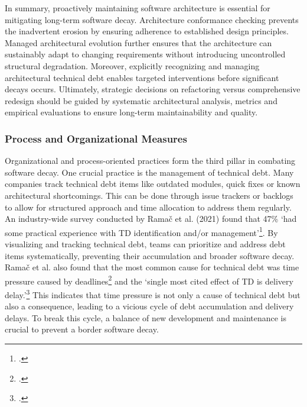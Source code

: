 In summary, proactively maintaining software architecture is essential for mitigating long-term software decay. Architecture conformance checking 
prevents the inadvertent erosion by ensuring adherence to established design principles. Managed architectural evolution further ensures that the architecture
can sustainably adapt to changing requirements without introducing uncontrolled structural degradation. Moreover, explicitly recognizing and managing architectural
technical debt enables targeted interventions before significant decays occurs. Ultimately, strategic decisions on refactoring versus comprehensive redesign should be 
guided by systematic architectural analysis, metrics and empirical evaluations to ensure long-term maintainability and quality.

\subsubsection{Process and Organizational Measures}
Organizational and process-oriented practices form the third pillar in combating software decay.
One crucial practice is the management of technical debt. Many companies track technical debt items like outdated modules, quick fixes or known architectural shortcomings.
This can be done through issue trackers or backlogs to allow for structured approach and time allocation to address them regularly.
An industry-wide survey conducted by Ramač et al. (2021) found that 47\% `had some practical experience with TD identification and/or management'\footcite[40]{ramacPrevalenceCommonCauses2021}.
By visualizing and tracking technical debt, teams can prioritize and address debt items systematically, preventing their accumulation and broader software decay.
Ramač et al. also found that the most common cause for technical debt was time pressure caused by deadlines\footcite[40]{ramacPrevalenceCommonCauses2021} and the `single most cited effect of TD is delivery delay.'\footcite[40]{ramacPrevalenceCommonCauses2021}
This indicates that time pressure is not only a cause of technical debt but also a consequence, leading to a vicious cycle of debt accumulation and delivery delays. To break this cycle, a balance of new development and maintenance is crucial to prevent a border software decay.\\

